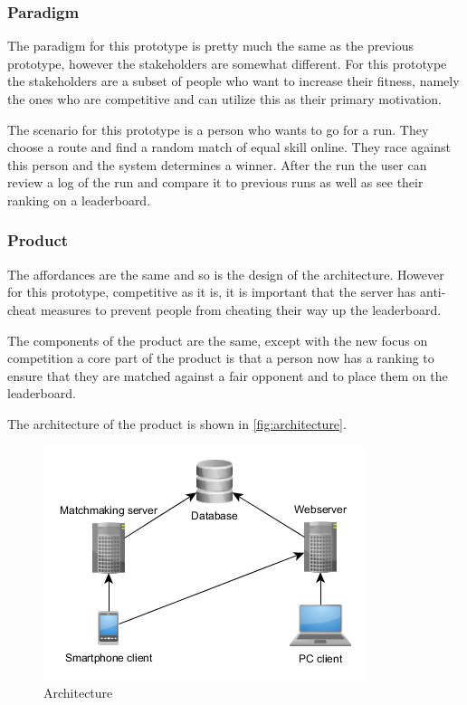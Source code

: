 \subsubsection{Paradigm}
The paradigm for this prototype is pretty much the same as the previous prototype, however the stakeholders are somewhat different. For this prototype the stakeholders are a subset of people who want to increase their fitness, namely the ones who are competitive and can utilize this as their primary motivation. 

The scenario for this prototype is a person who wants to go for a run. They choose a route and find a random match of equal skill online. They race against this person and the system determines a winner. After the run the user can review a log of the run and compare it to previous runs as well as see their ranking on a leaderboard. 

\subsubsection{Product}
The affordances are the same and so is the design of the architecture. However for this prototype, competitive as it is, it is important that the server has anti-cheat measures to prevent people from cheating their way up the leaderboard.

The components of the product are the same, except with the new focus on competition a core part of the product is that a person now has a ranking to ensure that they are matched against a fair opponent and to place them on the leaderboard.

The architecture of the product is shown in \autoref{fig:architecture}.

\begin{figure}[!ht]
	\begin{center}
		\includegraphics[scale=0.75]{img/architecture.png}
		\caption{Architecture}
		\label{fig:architecture}
	\end{center}
\end{figure}

